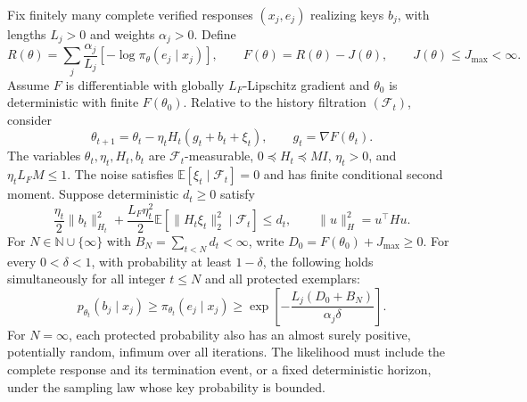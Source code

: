 \begin{theorem}
\label{ext:thm-stochastic-retention}
Fix finitely many complete verified responses $(x_j,e_j)$ realizing keys
$b_j$, with lengths $L_j>0$ and weights $\alpha_j>0$. Define
\[
 R(\theta)=\sum_j\frac{\alpha_j}{L_j}
             [-\log\pi_\theta(e_j\mid x_j)],\qquad
 F(\theta)=R(\theta)-J(\theta),\qquad J(\theta)\le J_{\max}<\infty.
\]
Assume $F$ is differentiable with globally $L_F$-Lipschitz gradient and
$\theta_0$ is deterministic with finite $F(\theta_0)$. Relative to the
history filtration $(\mathcal F_t)$, consider
\[
 \theta_{t+1}=\theta_t-\eta_t H_t(g_t+b_t+\xi_t),
 \qquad g_t=\nabla F(\theta_t).
\]
The variables $\theta_t,\eta_t,H_t,b_t$ are $\mathcal F_t$-measurable,
$0\preceq H_t\preceq MI$, $\eta_t>0$, and $\eta_t L_FM\le1$.
The noise satisfies $\mathbb E[\xi_t\mid\mathcal F_t]=0$ and has finite
conditional second moment. Suppose deterministic $d_t\ge0$ satisfy
\begin{equation}
 \frac{\eta_t}{2}\|b_t\|_{H_t}^{2}
 +\frac{L_F\eta_t^2}{2}
       \mathbb E[\|H_t\xi_t\|_2^2\mid\mathcal F_t]\le d_t,
 \qquad \|u\|_H^2=u^\top Hu.
 \label{ext:eq-optimizer-budget}
\end{equation}
For $N\in\mathbb N\cup\{\infty\}$ with
$B_N=\sum_{t<N}d_t<\infty$, write $D_0=F(\theta_0)+J_{\max}\ge0$.
For every $0<\delta<1$, with probability at least $1-\delta$, the following
holds simultaneously for all integer $t\le N$ and all protected exemplars:
\begin{equation}
 p_{\theta_t}(b_j\mid x_j)\ge\pi_{\theta_t}(e_j\mid x_j)
 \ge\exp\!\left[-\frac{L_j(D_0+B_N)}{\alpha_j\delta}\right].
 \label{ext:eq-stochastic-retention}
\end{equation}
For $N=\infty$, each protected probability also has an almost surely
positive, potentially random, infimum over all iterations. The likelihood
must include the complete response and its termination event, or a fixed
deterministic horizon, under the sampling law whose key probability is bounded.
\end{theorem}
